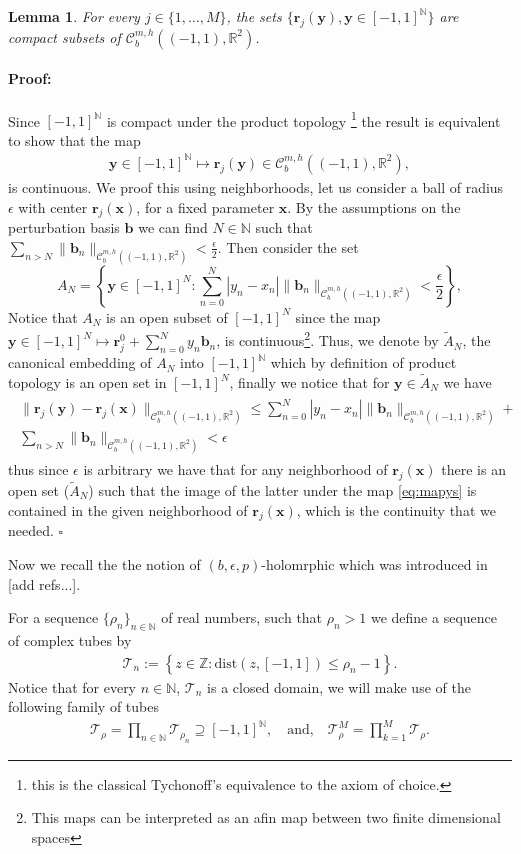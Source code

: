 \documentclass{article}
\newtheorem{lemma}[theorem]{Lemma}
\newenvironment{proof}{\paragraph{Proof:}}{\hfill$\square$}
\newcommand{\todo}[1]{{\color{red}[#1]}}
\newcommand{\IN}{{\mathbb N}}
\newcommand{\IR}{{\mathbb R}}
\newcommand{\IZ}{{\mathbb Z}}
\newcommand{\rgeoh}[2]{\mathcal{C}_b^{#1,#2}\left( (-1,1), \IR^2 \right)}
\newcommand{\br}{\bm{r}}
\newcommand{\bx}{\bm{x}}
\newcommand{\by}{\bm{y}}
\newcommand{\bb}{\bm{b}}
\begin{document}
\begin{lemma}
\label{lemma:parcompact}
For every $j \in  \{1,\hdots,M\}$, the sets $\{\br_j(\by), \by \in [-1,1]^{\IN} \}$  are compact subsets of $\rgeoh{m}{h}$. 
\end{lemma}
\begin{proof}
Since $[-1,1]^{\IN}$ is compact under the product topology \footnote{this is the classical Tychonoff's equivalence to the axiom of choice.} the result is equivalent to show that the map 
\begin{align}
\label{eq:mapys}
\by \in [-1,1]^{\IN} \mapsto \br_j(\by) \in \rgeoh{m}{h},
\end{align}
is continuous. We proof this using neighborhoods, let us consider a ball of radius $\epsilon$ with center $\br_j(\bx)$, for a fixed parameter $\bx$. By the assumptions on the perturbation basis $\bb$ we can find $N \in \IN$ such that $\sum_{n>N}\|\bb_n\|_{\rgeoh{m}{h}}< \frac{\epsilon}{2}$. Then consider the set 
$$
A_N =\left\lbrace \by \in [-1,1]^{N}:  \sum_{n=0}^N |y_n-x_n| \|\bb_n \|_{\rgeoh{m}{h}} < \frac{\epsilon}{2}\right\rbrace,
$$
Notice that $A_N$ is an open subset of $[-1,1]^N$ since the map $ \by \in [-1,1]^N \mapsto  \br_j^0 + \sum_{n=0}^N y_n \bb_n$, is continuous\footnote{This maps can be interpreted as an afin map between two finite dimensional spaces}. Thus, we denote by $\widetilde{A}_N$, the canonical embedding of $A_N$ into $[-1,1]^\IN$ which by definition of product topology is an open set in $[-1,1]^N$, finally we notice that for $\by \in \widetilde{A}_N$ we have 
\begin{align*}
\begin{split}
\|\br_j(\by) - \br_j(\bx)\|_{\rgeoh{m}{h}} 
\leq 
\sum_{n=0}^N |y_n-x_n|\|\bb_n \|_{\rgeoh{m}{h}} +\\ \sum_{n >N}\|\bb_n \|_{\rgeoh{m}{h}} < \epsilon
\end{split}
\end{align*}
thus since $\epsilon$ is arbitrary we have that for any neighborhood of $\br_j(\bx)$ there is an open set ($\widetilde{A}_N$) such that the image of the latter under the map \ref{eq:mapys} is contained in the given neighborhood of $\br_j(\bx)$, which is the continuity that we needed.
\end{proof}


Now we recall the the notion of $(b,\epsilon,p)$-holomrphic which was introduced in \todo{add refs...}.

 For a sequence $\{\rho_n\}_{n \in \IN}$ of real numbers, such that $\rho_n  >1$ we define a sequence of complex tubes by 
\begin{align*}
\mathcal{T}_n := \left\lbrace z \in \IZ : \text{dist}(z,[-1,1]) \leq \rho_n-1 \right\rbrace.
\end{align*}
Notice that for every $n \in \IN$, $\mathcal{T}_n$ is a closed domain, we will make use of the following family of tubes 
\begin{align*}
\mathcal{T}_{\rho} = \prod_{n \in \IN} \mathcal{T}_{\rho_n} \supseteq [-1,1]^{\IN}, \quad \text{and,} \quad
\mathcal{T}^M_{\rho} = \prod_{k=1}^M \mathcal{T}_{\rho}.
\end{align*}
\end{document}
